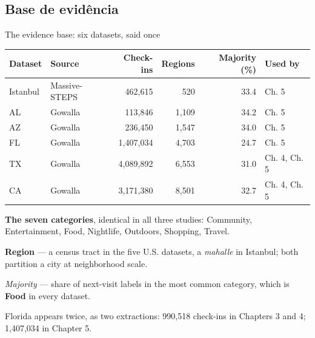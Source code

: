 \documentclass{beamer}
\begin{document}
\subsection{Base de evidência}

\begin{frame}{The evidence base: six datasets, said once}
    \centering
    \small
    \renewcommand{\arraystretch}{1.15}\begin{tabular}{@{}llrrrl@{}}
        \toprule
        Dataset & Source & Check-ins & Regions & Majority (\%) & Used by \\
        \midrule
        Istanbul & Massive-STEPS & 462,615   & 520   & 33.4 & Ch. 5 \\
        AL       & Gowalla       & 113,846   & 1,109 & 34.2 & Ch. 5 \\
        AZ       & Gowalla       & 236,450   & 1,547 & 34.0 & Ch. 5 \\
        FL       & Gowalla       & 1,407,034 & 4,703 & 24.7 & Ch. 5 \\
        TX       & Gowalla       & 4,089,892 & 6,553 & 31.0 & Ch. 4, Ch. 5 \\
        CA       & Gowalla       & 3,171,380 & 8,501 & 32.7 & Ch. 4, Ch. 5 \\
        \bottomrule
    \end{tabular}

    \medskip
    \raggedright
    \footnotesize
    \textbf{The seven categories}, identical in all three studies: Community, Entertainment,
    Food, Nightlife, Outdoors, Shopping, Travel.\par
    \smallskip
    \textbf{Region} --- a census tract in the five U.S. datasets, a \textit{mahalle} in Istanbul;
    both partition a city at neighborhood scale.\par
    \smallskip
    \textit{Majority} --- share of next-visit labels in the most common category, which is
    \textbf{Food} in every dataset.\par
    \smallskip
    \alert{Florida appears twice, as two extractions:} 990,518 check-ins in Chapters 3 and 4;
    1,407,034 in Chapter 5.\par
\end{frame}
\end{document}
